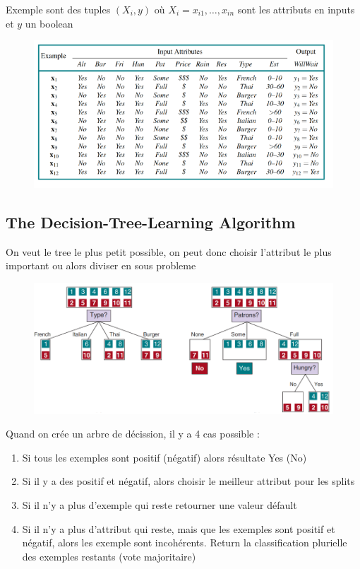 \documentclass[12pt]{article}
\begin{document}
		Exemple sont des tuples $(X_i, y)$ où $X_i = x_{i1},\dots,x_{in}$ sont les attributs en inputs et $y$ un boolean
		
		\begin{figure}[H]
			\centering
			\includegraphics[width=.8\textwidth]{img/DCFE.png}
		\end{figure}
		
	\subsection{The Decision-Tree-Learning Algorithm}
		On veut le tree le plus petit possible, on peut donc choisir l'attribut le plus important ou alors diviser en sous probleme
		\begin{figure}[H]
			\centering
			\includegraphics[width=.8\textwidth]{img/DTLA.png}
		\end{figure}
		
		Quand on crée un arbre de décission, il y a 4 cas possible :
		\begin{enumerate}
			\item Si tous les exemples sont positif (négatif) alors résultate Yes (No)
			\item Si il y a des positif et négatif, alors choisir le meilleur attribut pour les splits
			
			\item Si il n'y a plus d'exemple qui reste retourner une valeur défault
			\item Si il n'y a plus d'attribut qui reste, mais que les exemples sont positif et négatif, alors les exemple sont incohérents. Return la classification plurielle des exemples restants (vote majoritaire)
		\end{enumerate}
		
\end{document}
